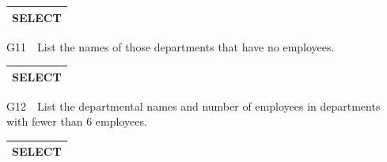 \begin{flushleft}
\tablefirsthead{}
\tablehead{}
\tabletail{}
\tablelasttail{}
\begin{supertabular}{|m{14.266cm}|}
\hline
SELECT

\\\hline
\end{supertabular}
\end{flushleft}
G11\ \ List the names of those departments that have no employees.

\begin{flushleft}
\tablefirsthead{}
\tablehead{}
\tabletail{}
\tablelasttail{}
\begin{supertabular}{|m{14.266cm}|}
\hline
SELECT

\\\hline
\end{supertabular}
\end{flushleft}
G12\ \ List the departmental names and number of employees in departments with fewer than 6 employees.

\begin{flushleft}
\tablefirsthead{}
\tablehead{}
\tabletail{}
\tablelasttail{}
\begin{supertabular}{|m{14.266cm}|}
\hline
SELECT

\\\hline
\end{supertabular}
\end{flushleft}
\clearpage

